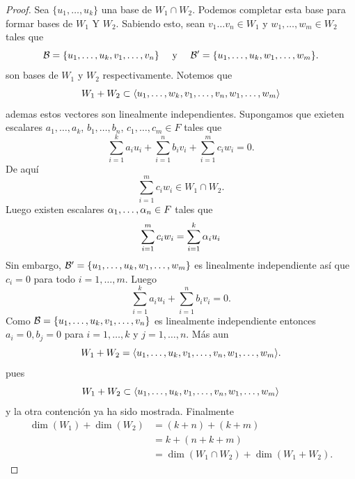 \documentclass[12pt,a4paper]{book}
\begin{document}
    \begin{proof}
        Sea $\{u_{1},\dots,u_{k}\}$ una base de $W_{1}\cap W_{2}$. Podemos completar esta
        base para formar bases de $W_{1}$ Y $W_{2}$. Sabiendo esto, sean $v_{1}\dots v_{n}\in W_{1}$
        y $w_{1},\dots,w_{m}\in W_{2}$ tales que
        \begin{equation*}
            \mathcal{B}=\{u_{1},\dots,u_{k},v_{1},\dots,v_{n}\}\quad\text{ y }\quad\mathcal{B}^{\prime}=\{u_{1},\dots,u_{k},w_{1},\dots,w_{m}\}.
        \end{equation*}
        son bases de $W_{1}$ y $W_{2}$ respectivamente. Notemos que
        \begin{equation*}
            W_{1}+W_{2}\subset\langle u_{1},\dots,w_{k},v_{1},\dots,v_{n},w_{1},\dots,w_{m} \rangle
        \end{equation*}
        ademas estos vectores son linealmente independientes. Supongamos que exieten escalares
        $a_{1},\dots,a_{k}$, $b_{1},\dots,b_{n}$, $c_{1},\dots,c_{m}\in F$ tales que
        \begin{equation*}
            \sum_{i=1}^{k}a_{i}u_{i}+\sum_{i=1}^{n}b_{i}v_{i}+\sum_{i=1}^{m}c_{i}w_{i}=0.
        \end{equation*}
        De aquí
        \begin{equation*}
            \sum_{i=1}^{m}c_{i}w_{i}\in W_{1}\cap W_{2}.
        \end{equation*}
        Luego existen escalares $\alpha_{1},\dots,\alpha_{n}\in F$ tales que
        \begin{equation*}
            \sum_{i=1}^{m}c_{i}w_{i}=\sum_{i=1}^{k}\alpha_{i}u_{i}
        \end{equation*}
        Sin embargo, $\mathcal{B}^{\prime}=\{u_{1},\dots,u_{k},w_{1},\dots,w_{m}\}$ es linealmente independiente
        así que $c_{i}=0$ para todo $i=1,\dots,m$. Luego
        \begin{equation*}
            \sum_{i=1}^{k}a_{i}u_{i}+\sum_{i=1}^{n}b_{i}v_{i}=0.
        \end{equation*}
        Como $\mathcal{B}=\{u_{1},\dots,u_{k},v_{1},\dots,v_{n}\}$ es linealmente independiente entonces
        $a_{i}=0,b_{j}=0$ para $i=1,\dots,k$ y $j=1,\dots,n$. Más aun
        \begin{equation*}
            W_{1}+W_{2}=\langle u_{1},\dots,u_{k},v_{1},\dots,v_{n},w_{1},\dots,w_{m} \rangle.
        \end{equation*}
        pues
        \begin{equation*}
            W_{1}+W_{2}\subset\langle u_{1},\dots,u_{k},v_{1},\dots,v_{n},w_{1},\dots,w_{m} \rangle
        \end{equation*}
        y la otra contención ya ha sido mostrada. Finalmente
        \begin{align*}
            \dim(W_{1})+\dim(W_{2})&=(k+n)+(k+m)\\
            &=k+(n+k+m)\\
            &=\dim(W_{1}\cap W_{2})+\dim(W_{1}+W_{2}).
        \end{align*}
    \end{proof}
\end{document}
